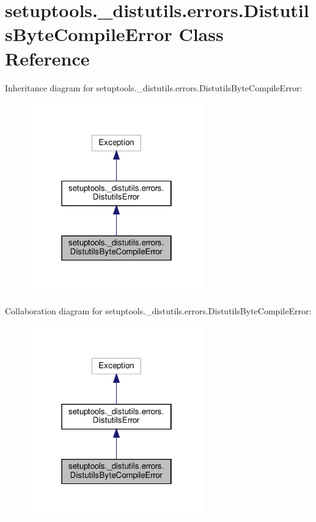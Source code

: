 \hypertarget{classsetuptools_1_1__distutils_1_1errors_1_1DistutilsByteCompileError}{}\section{setuptools.\+\_\+distutils.\+errors.\+Distutils\+Byte\+Compile\+Error Class Reference}
\label{classsetuptools_1_1__distutils_1_1errors_1_1DistutilsByteCompileError}


Inheritance diagram for setuptools.\+\_\+distutils.\+errors.\+Distutils\+Byte\+Compile\+Error\+:
\nopagebreak
\begin{figure}[H]
\begin{center}
\leavevmode
\includegraphics[width=214pt]{classsetuptools_1_1__distutils_1_1errors_1_1DistutilsByteCompileError__inherit__graph}
\end{center}
\end{figure}


Collaboration diagram for setuptools.\+\_\+distutils.\+errors.\+Distutils\+Byte\+Compile\+Error\+:
\nopagebreak
\begin{figure}[H]
\begin{center}
\leavevmode
\includegraphics[width=214pt]{classsetuptools_1_1__distutils_1_1errors_1_1DistutilsByteCompileError__coll__graph}
\end{center}
\end{figure}


